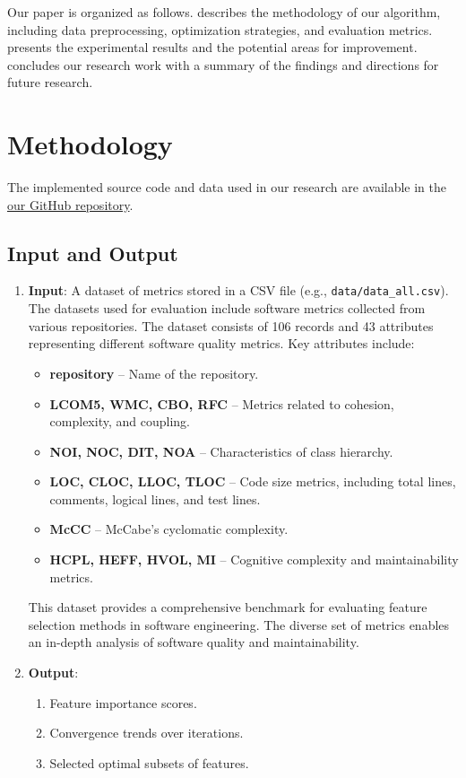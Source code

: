 \documentclass{styles/svproc}
\begin{document}
Our paper is organized as follows.  describes the methodology of our algorithm, including data preprocessing, optimization strategies, and evaluation metrics.  presents the experimental results and the potential areas for improvement.  concludes our research work with a summary of the findings and directions for future research.

\section{Methodology}
\label{S:Methodology}

The implemented source code and data used in our research are available in the \href{https://github.com/dayveedaniel/ASE_Project_team_3/tree/main}{our GitHub repository}.

\subsection{Input and Output}\label{input-output}

\begin{enumerate}
    \item \textbf{Input}:  
    A dataset of metrics stored in a CSV file (e.g., \texttt{data/data\_all.csv}).
    The datasets used for evaluation include software metrics collected from various repositories. The dataset consists of 106 records and 43 attributes representing different software quality metrics. Key attributes include:
\begin{itemize}
    \item \textbf{repository} – Name of the repository.
    \item \textbf{LCOM5, WMC, CBO, RFC} – Metrics related to cohesion, complexity, and coupling.
    \item \textbf{NOI, NOC, DIT, NOA} – Characteristics of class hierarchy.
    \item \textbf{LOC, CLOC, LLOC, TLOC} – Code size metrics, including total lines, comments, logical lines, and test lines.
    \item \textbf{McCC} – McCabe's cyclomatic complexity.
    \item \textbf{HCPL, HEFF, HVOL, MI} – Cognitive complexity and maintainability metrics.
\end{itemize}
    This dataset provides a comprehensive benchmark for evaluating feature selection methods in software engineering. The diverse set of metrics enables an in-depth analysis of software quality and maintainability.
    \item \textbf{Output}:  
    \begin{enumerate}
        \item Feature importance scores.  
        \item Convergence trends over iterations.  
        \item Selected optimal subsets of features.
    \end{enumerate}
\end{enumerate}
\end{document}
